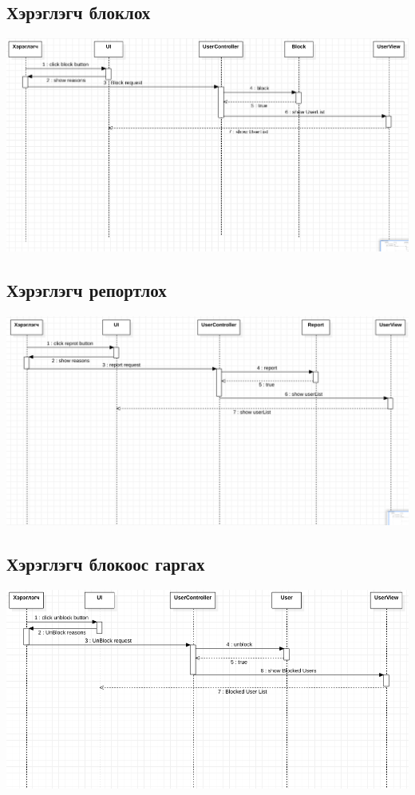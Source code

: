 \documentclass[
oneside, %
english, %
onehalfspacing, %
nolistspacing, %
headsepline, %
]{article} %
\begin{document}
     \subsection{Хэрэглэгч блоклох}
     \includegraphics[width=\textwidth]{block}
     \subsection{Хэрэглэгч репортлох}
     \includegraphics[width=\textwidth]{reportSequence}
     \subsection{Хэрэглэгч блокоос гаргах}
     \includegraphics[width=\textwidth]{unBlock}
     
\end{document}
